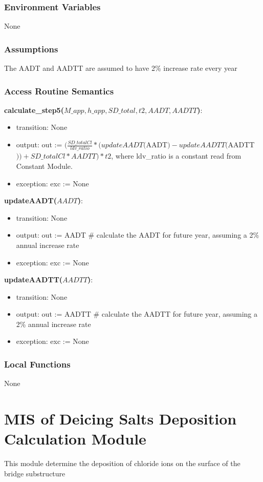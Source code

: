 \documentclass[12pt, titlepage]{article}
\begin{document}
\subsubsection{Environment Variables}
None
\subsubsection{Assumptions}
The AADT and AADTT are assumed to have 2\% increase rate every year
\subsubsection{Access Routine Semantics}

\noindent \textbf{calculate\_step5($M\_app, h\_app, SD\_total, t2, AADT, AADTT$)}:
\begin{itemize}
\item transition: None
\item output: out := $(\frac{SD\_totalCl}{ldv\_ratio}*(updateAADT($AADT$)-updateAADTT($AADTT$))+ SD\_totalCl* AADTT) * t2$, where ldv\_ratio is a constant read from Constant Module.
\item exception: exc := None
\end{itemize}
\noindent \textbf{updateAADT($AADT$)}:
\begin{itemize}
\item transition: None
\item output: out := AADT \# calculate the AADT for future year, assuming a 2\% annual increase rate 
\item exception: exc := None
\end{itemize}
\noindent \textbf{updateAADTT($AADTT$)}:
\begin{itemize}
\item transition: None
\item output: out := AADTT \# calculate the AADTT for future year, assuming a 2\% annual increase rate 
\item exception: exc := None
\end{itemize}


\subsubsection{Local Functions}
None

\newpage


\section{MIS of Deicing Salts Deposition Calculation Module} \label{deicingSaltsDepositionCalculation Module}
This module determine the deposition of chloride ions on the surface of the bridge substructure
\end{document}
